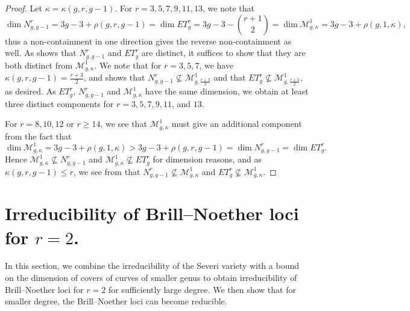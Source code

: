 \documentclass[11pt]{amsart}
\newcommand{\BN}[3]{\mathcal{M}^{#2}_{#1,#3}}
\newtheorem{theorem}{Theorem}[section]
\theoremstyle{definition}
\theoremstyle{definition}
\begin{document}
\begin{proof}
	Let $\kappa=\kappa(g,r,g-1)$. For $r=3,5,7,9,11,13$, we note that 
	\[\dim N^r_{g,g-1}=3g-3+\rho(g,r,g-1)=\dim ET^r_g=3g-3-{r+1\choose 2}=\dim\BN{g}{1}{\kappa}= 3g-3+\rho\left(g,1,\kappa\right),\]
	 thus a non-containment in one direction gives the reverse non-containment as well. 
	 As  shows that $N^r_{g,g-1}$ and $ET^r_{g}$ are distinct, it suffices to show that they are both distinct from $\BN{g}{1}{\kappa}$.
	  We note that for $r=3,5,7$, we have $\kappa(g,r,g-1)=\frac{r+3}{2}$, and  shows that $N^r_{g,g-1}\nsubseteq \BN{g}{1}{\frac{r+3}{2}}$ and that $ET^r_g\nsubseteq \BN{g}{1}{\frac{r+3}{2}}$, as desired. As $ET^r_g$, $N^r_{g,g-1}$ and $\BN{g}{1}{\kappa}$ have the same dimension, we obtain at least three distinct components for $r=3,5,7,9,11$, and $13$.
	
	 For $r=8,10,12$ or $r\geq 14$, we see that $\BN{g}{1}{\kappa}$ must give an additional component from the fact that
	 \[\dim \BN{g}{1}{\kappa}=3g-3+\rho(g,1,\kappa)>3g-3+\rho(g,r,g-1)=\dim N^r_{g,g-1}=\dim ET^r_g.\] Hence $\BN{g}{1}{\kappa}\nsubseteq N^r_{g,g-1}$ and $\BN{g}{1}{\kappa}\nsubseteq ET^r_{g}$ for dimension reasons, and as $\kappa(g,r,g-1)\leq r$, we see from  that $N^r_{g,g-1}\nsubseteq \BN{g}{1}{\kappa}$ and $ET^r_g \nsubseteq\BN{g}{1}{\kappa}$.
\end{proof}


\section{Irreducibility of Brill--Noether loci for $r=2$.}\label{sec:Irred BN loci}

In this section, we combine the irreducibility of the Severi variety with a bound on the dimension of covers of curves of smaller genus to obtain irreducibility of  Brill--Noether loci for $r=2$
for sufficiently large degree.
We then show that for smaller degree, the Brill--Noether loci can become reducible.
\end{document}
